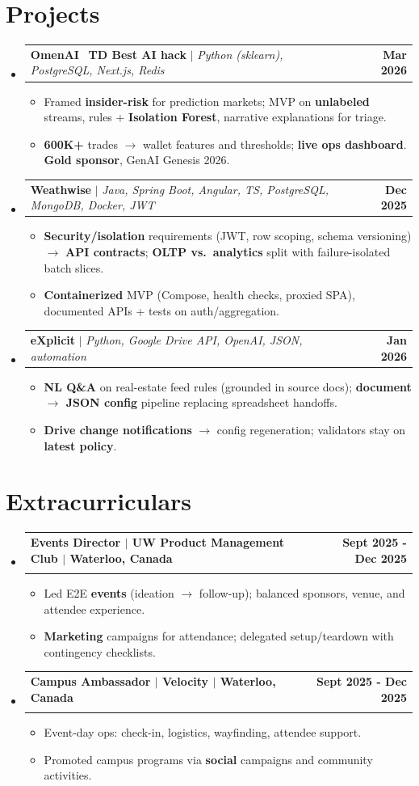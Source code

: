 \documentclass[letterpaper,11pt]{article}
\makeatletter
\newcommand{\resumeItem}[1]{
  \item\small{
    {#1 \vspace{-2pt}}
  }
}
\newcommand{\resumeSubheading}[4]{
  \vspace{-2pt}\item
    \begin{tabular*}{1.0\textwidth}[t]{l@{\extracolsep{\fill}}r}
      \textbf{#1} & \textbf{\small #2} \\
      \textit{\small#3} & \textit{\small#4} \\[-2pt]
    \end{tabular*}\vspace{-2pt}
}
\newcommand{\resumeProjectHeading}[2]{
    \item
    \begin{tabularx}{\textwidth}{@{}Xr@{}}
      \small#1 & \textbf{\small #2}\\
    \end{tabularx}\vspace{-5pt}
}
\newcommand{\resumeSubHeadingListStart}{\begin{itemize}[leftmargin=0.0in, label={}]}
\newcommand{\resumeSubHeadingListEnd}{\end{itemize}}
\newcommand{\resumeItemListStart}{\begin{itemize}[leftmargin=0.14in, topsep=0pt, itemsep=0pt, parsep=0pt, partopsep=0pt]}
\newcommand{\resumeItemListEnd}{\end{itemize}\vspace{-2pt}}
\makeatother
\begin{document}
\section{Projects}
    \resumeSubHeadingListStart
    \resumeProjectHeading
          {\textbf{OmenAI} \textbar\ \textbf{TD Best AI hack} $|$ \emph{Python (sklearn), PostgreSQL, Next.js, Redis}}{Mar 2026}
    \resumeItemListStart
    \resumeItem{Framed \textbf{insider-risk} for prediction markets; MVP on \textbf{unlabeled} streams, rules + \textbf{Isolation Forest}, narrative explanations for triage.}
    \resumeItem{\textbf{600K+} trades $\rightarrow$ wallet features and thresholds; \textbf{live ops dashboard}. \textbf{Gold sponsor}, GenAI Genesis 2026.}
          \resumeItemListEnd
      \resumeProjectHeading
          {\textbf{Weathwise} $|$ \emph{Java, Spring Boot, Angular, TS, PostgreSQL, MongoDB, Docker, JWT}}{Dec 2025}
          \resumeItemListStart
            \resumeItem{\textbf{Security/isolation} requirements (JWT, row scoping, schema versioning) $\rightarrow$ \textbf{API contracts}; \textbf{OLTP vs.\ analytics} split with failure-isolated batch slices.}
            \resumeItem{\textbf{Containerized} MVP (Compose, health checks, proxied SPA), documented APIs + tests on auth/aggregation.}
          \resumeItemListEnd
      \resumeProjectHeading
{\textbf{eXplicit} $|$ \emph{Python, Google Drive API, OpenAI, JSON, automation}}{Jan 2026}
\resumeItemListStart
    \resumeItem{\textbf{NL Q\&A} on real-estate feed rules (grounded in source docs); \textbf{document $\rightarrow$ JSON config} pipeline replacing spreadsheet handoffs.}
    \resumeItem{\textbf{Drive change notifications} $\rightarrow$ config regeneration; validators stay on \textbf{latest policy}.}
\resumeItemListEnd
    \resumeSubHeadingListEnd

\vspace{-4pt}
\section{Extracurriculars}
  \resumeSubHeadingListStart
    \resumeSubheading
      {Events Director $|$ UW Product Management Club $|$ Waterloo, Canada}{Sept 2025 - Dec 2025}
      {}{}
      \resumeItemListStart
        \resumeItem{Led E2E \textbf{events} (ideation $\rightarrow$ follow-up); balanced sponsors, venue, and attendee experience.}
        \resumeItem{\textbf{Marketing} campaigns for attendance; delegated setup/teardown with contingency checklists.}
      \resumeItemListEnd
    \resumeSubheading
      {Campus Ambassador $|$ Velocity $|$ Waterloo, Canada}{Sept 2025 - Dec 2025}
      {}{}
      \resumeItemListStart
        \resumeItem{Event-day ops: check-in, logistics, wayfinding, attendee support.}
        \resumeItem{Promoted campus programs via \textbf{social} campaigns and community activities.}
      \resumeItemListEnd
  \resumeSubHeadingListEnd
\end{document}

